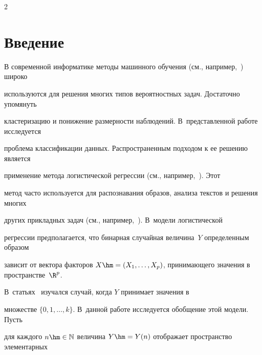 




      \thispagestyle{headings}





      \begin{multicols}{2}





            \label{st\stat}








\section{Введение}











В современной информатике методы машинного обучения (см., например,~\cite{ML}) широко 


используются для решения многих типов вероятностных задач. Достаточно упомянуть 


кластеризацию и понижение размерности наблюдений. В~представленной работе исследуется 


проб\-ле\-ма классификации данных. Распространенным подходом к ее решению является 


применение метода логистической регрессии (см., например,~\cite{Francis,LONG}). Этот 


метод час\-то используется для распознавания образов, анализа текстов и решения многих 


других прикладных задач (см., например,~\cite{text, tensor}). В~модели логистической 


регрессии предполагается, что бинарная случайная величина~$Y$ определенным образом 


зависит от вектора факторов $X\hm=(X_1,\ldots,X_p)$, принимающего значения в пространстве~$\R^p$. 


В~статьях~\cite{Anderson,hossain} изучался случай, когда $Y$ принимает значения в 


множестве $\{0,1,\ldots,k\}$. В~данной работе исследуется обобщение этой модели. Пусть 


для каждого $n\hm\in\mathbb{N}$ величина $Y\hm=Y(n)$ отображает пространство элементарных 



\end{multicols}
